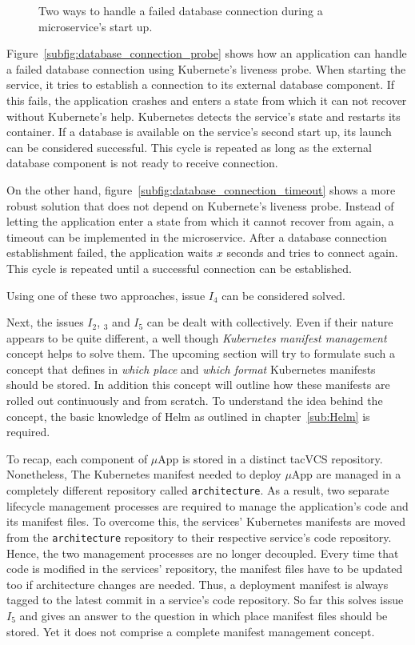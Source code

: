 \begin{figure}[H]
{  }
  \hspace*{\fill}%

  \caption{Two ways to handle a failed database connection during a microservice's start up.}%
  \label{fig:database_connection_start_up}
\end{figure}

Figure~\ref{subfig:database_connection_probe} shows how an application can
handle a failed database connection using Kubernete's liveness probe. When
starting the service, it tries to establish a connection to its external
database component. If this fails, the application crashes and enters a state
from which it can not recover without Kubernete's help. Kubernetes detects the
service's state and restarts its container. If a database is available on the
service's second start up, its launch can be considered successful. This cycle
is repeated as long as the external database component is not ready to receive
connection.

On the other hand, figure~\ref{subfig:database_connection_timeout} shows a more
robust solution that does not depend on Kubernete's liveness probe. Instead of
letting the application enter a state from which it cannot recover from again,
a timeout can be implemented in the microservice. After a database connection
establishment failed, the application waits $x$ seconds and tries to connect
again. This cycle is repeated until a successful connection can be established.

Using one of these two approaches, issue $I_4$ can be considered solved.

Next, the issues $I_2$, $_3$ and $I_5$ can be dealt with collectively. Even if
their nature appears to be quite different, a well though \textit{Kubernetes
manifest management} concept helps to solve them. The upcoming section will try
to formulate such a concept that defines in \textit{which place} and
\textit{which format} Kubernetes manifests should be stored. In addition this
concept will outline how these manifests are rolled out continuously and from
scratch. To understand the idea behind the concept, the basic knowledge of Helm
as outlined in chapter~\ref{sub:Helm} is required.

To recap, each component of $\mu$App is stored in a distinct tac{VCS}
repository. Nonetheless, The Kubernetes manifest needed to deploy $\mu$App are
managed in a completely different repository called \texttt{architecture}. As a
result, two separate lifecycle management processes are required to manage the
application's code and its manifest files. To overcome this, the services'
Kubernetes manifests are moved from the \texttt{architecture} repository to
their respective service's code repository. Hence, the two management processes
are no longer decoupled. Every time that code is modified in the services'
repository, the manifest files have to be updated too if architecture changes
are needed. Thus, a deployment manifest is always tagged to the latest commit
in a service's code repository. So far this solves issue $I_5$ and gives an
answer to the question in which place manifest files should be stored. Yet it
does not comprise a complete manifest management concept.

